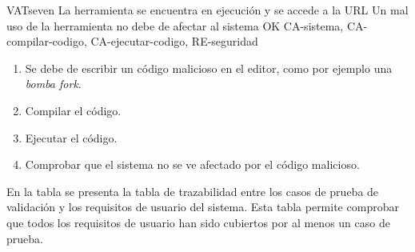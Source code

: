 \begin{testCase}{VAT}{seven}
    {La herramienta se encuentra en ejecución y se accede a la URL}
    {\NA}
    {Un mal uso de la herramienta no debe de afectar al sistema}
    {OK}
    {CA-sistema, CA-compilar-codigo, CA-ejecutar-codigo, RE-seguridad}
    \begin{enumerate}
        \item Se debe de escribir un código malicioso en el editor, como por ejemplo una \textit{bomba fork}.
        \item Compilar el código.
        \item Ejecutar el código.
        \item Comprobar que el sistema no se ve afectado por el código malicioso.
    \end{enumerate}
\end{testCase}
    

En la tabla  se presenta la tabla de trazabilidad entre los casos de prueba de validación y los requisitos de usuario del sistema. Esta tabla permite comprobar que todos los requisitos de usuario han sido cubiertos por al menos un caso de prueba.
\FloatBarrier

\begin{landscape}
    \begin{table}[htb]
          {\traceabilityVATUR}
      \end{table}
    \end{landscape}
    

